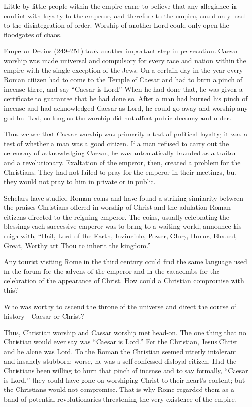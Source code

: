Little by little people within the empire came to believe that any allegiance in conflict with
loyalty to the emperor, and therefore to the empire, could only lead to the disintegration of order.
Worship of another Lord could only open the floodgates of chaos.

Emperor Decius (249–251) took another important step in persecution. Caesar worship was made
universal and compulsory for every race and nation within the empire with the single exception of
the Jews. On a certain day in the year every Roman citizen had to come to the Temple of Caesar and
had to burn a pinch of incense there, and say “Caesar is Lord.” When he had done that, he was given
a certificate to guarantee that he had done so. After a man had burned his pinch of incense and had
acknowledged Caesar as Lord, he could go away and worship any god he liked, so long as the worship
did not affect public decency and order.

Thus we see that Caesar worship was primarily a test of political loyalty; it was a test of whether
a man was a good citizen. If a man refused to carry out the ceremony of acknowledging Caesar, he was
automatically branded as a traitor and a revolutionary. Exaltation of the emperor, then, created a
problem for the Christians. They had not failed to pray for the emperor in their meetings, but they
would not pray to him in private or in public.

Scholars have studied Roman coins and have found a striking similarity between the praises
Christians offered in worship of Christ and the adulation Roman citizens directed to the reigning
emperor. The coins, usually celebrating the blessings each successive emperor was to bring to a
waiting world, announce his reign with, “Hail, Lord of the Earth, Invincible, Power, Glory, Honor,
Blessed, Great, Worthy art Thou to inherit the kingdom.”

Any tourist visiting Rome in the third century could find the same language used in the forum for
the advent of the emperor and in the catacombs for the celebration of the appearance of Christ. How
could a Christian compromise with this?

Who was worthy to ascend the throne of the universe and direct the course of history—Caesar or
Christ?

Thus, Christian worship and Caesar worship met head-on. The one thing that no Christian would ever
say was “Caesar is Lord.” For the Christian, Jesus Christ and he alone was Lord. To the Roman the
Christian seemed utterly intolerant and insanely stubborn; worse, he was a self-confessed disloyal
citizen. Had the Christians been willing to burn that pinch of incense and to say formally, “Caesar
is Lord,” they could have gone on worshiping Christ to their heart’s content; but the Christians
would not compromise. That is why Rome regarded them as a band of potential revolutionaries
threatening the very existence of the empire.

